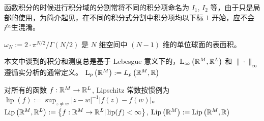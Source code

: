 函数积分的时候进行积分域的分割常将不同的积分项命名为 $I_1$, $I_2$ 等，由于只是局部的使用，为简介起见，在不同的积分式分割中积分项均以下标 $1$ 开始，应不会产生混淆。





$\omega_{N}:=2 \cdot \pi^{N / 2} / \Gamma(N / 2)$ 是 $N$ 维空间中 $(N-1)$ 维的单位球面的表面积。



本文中谈到的积分和测度总是基于 Lebesgue 意义下的，$\mathrm{L}_{\infty}\left({\mathbb{R}}^{M}, {\mathbb{R}}^{L}\right)$ 和 $\|\cdot\|_{\infty}$ 遵循实分析的通常定义。 $\mathrm{L}_{p}\left({\mathbb{R}}^{M}\right):=L_{p}\left({\mathbb{R}}^{M}, {\mathbb{R}}\right)$

对所有的函数 $f: {\mathbb{R}}^{M} \rightarrow {\mathbb{R}}^{L}$, Lipschitz 常数按惯例为 $\operatorname{lip}(f):=\sup _{z \neq w}|z-w|^{-1}|f(z)-f(w)|$。
$\operatorname{Lip}\left({\mathbb{R}}^{M}, {\mathbb{R}}^{L}\right):=\left\{f: {\mathbb{R}}^{M} \rightarrow {\mathbb{R}}^{L} | \operatorname{lip}(f)<\infty\right\}$,  $\operatorname{Lip}\left({\mathbb{R}}^{M}\right):=\operatorname{Lip}\left({\mathbb{R}}^{M}, {\mathbb{R}}\right)$
























